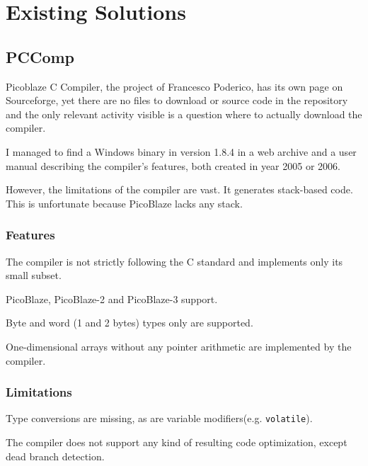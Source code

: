 
\chapter{Existing Solutions}\label{existing}

    \section{PCComp}\label{pccomp}

    Picoblaze C Compiler, the project of Francesco Poderico, has its own page on Sourceforge, 
    yet there are no files to download or source code in the repository and the only relevant activity visible is a question where to actually download the compiler.

    I managed to find a Windows binary in version 1.8.4 in a web archive and a user manual describing the compiler's features, both created in year 2005 or 2006.

    However, the limitations of the compiler are vast. It generates stack-based code. This is unfortunate because PicoBlaze lacks any stack. 

        \subsection{Features}

        The compiler is not strictly following the C standard and implements only its small subset.

        PicoBlaze, PicoBlaze-2 and PicoBlaze-3 support.

        Byte and word (1 and 2 bytes) types only are supported.

        One-dimensional arrays without any pointer arithmetic are implemented by the compiler.

        \subsection{Limitations}

        Type conversions are missing, as are variable modifiers(e.g. \texttt{volatile}). 

        The compiler does not support any kind of resulting code optimization, except dead branch detection.

